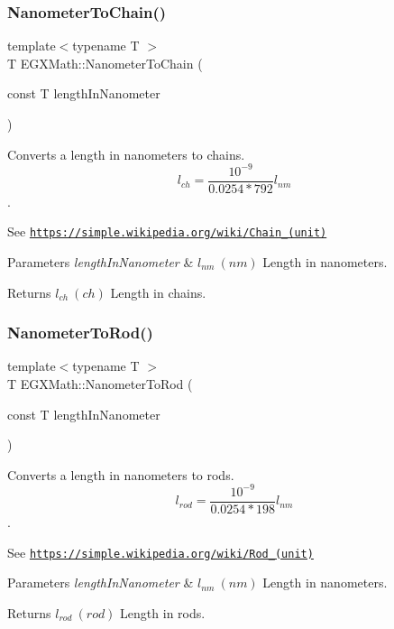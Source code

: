 \subsubsection{\texorpdfstring{Nanometer\+To\+Chain()}{NanometerToChain()}}
{\footnotesize\ttfamily template$<$typename T $>$ \\
T E\+G\+X\+Math\+::\+Nanometer\+To\+Chain (\begin{DoxyParamCaption}\item[{const T}]{length\+In\+Nanometer }\end{DoxyParamCaption})}



Converts a length in nanometers to chains. \[ l_{ch}= \frac{10^{-9}}{0.0254 * 792} l_{nm} \]. 

See \href{https://simple.wikipedia.org/wiki/Chain_(unit)}{\tt https\+://simple.\+wikipedia.\+org/wiki/\+Chain\+\_\+(unit)} 
\begin{DoxyParams}{Parameters}
{\em length\+In\+Nanometer} & $ l_{nm}\ (nm)$ Length in nanometers. \\
\hline
\end{DoxyParams}
\begin{DoxyReturn}{Returns}
$ l_{ch}\ (ch)$ Length in chains. 
\end{DoxyReturn}
\mbox{\label{group___e_g_x_math-_conversions-_length_conversions-_nanometer-_surveyors_ga4677e0e0b8662f3786f43cea2f76e8d9}} 
\subsubsection{\texorpdfstring{Nanometer\+To\+Rod()}{NanometerToRod()}}
{\footnotesize\ttfamily template$<$typename T $>$ \\
T E\+G\+X\+Math\+::\+Nanometer\+To\+Rod (\begin{DoxyParamCaption}\item[{const T}]{length\+In\+Nanometer }\end{DoxyParamCaption})}



Converts a length in nanometers to rods. \[ l_{rod}= \frac{10^{-9}}{0.0254 * 198} l_{nm} \]. 

See \href{https://simple.wikipedia.org/wiki/Rod_(unit)}{\tt https\+://simple.\+wikipedia.\+org/wiki/\+Rod\+\_\+(unit)} 
\begin{DoxyParams}{Parameters}
{\em length\+In\+Nanometer} & $ l_{nm}\ (nm)$ Length in nanometers. \\
\hline
\end{DoxyParams}
\begin{DoxyReturn}{Returns}
$ l_{rod}\ (rod)$ Length in rods. 
\end{DoxyReturn}
